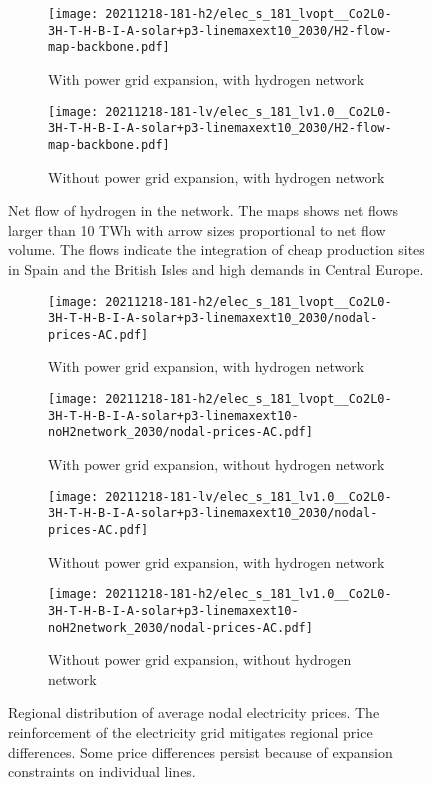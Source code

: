 \begin{figure}
    \begin{subfigure}{0.49\textwidth}
        \centering
        \caption{With power grid expansion, with hydrogen network}
        \texttt{[image: 20211218-181-h2/elec\_s\_181\_lvopt\_\_Co2L0-3H-T-H-B-I-A-solar+p3-linemaxext10\_2030/H2-flow-map-backbone.pdf]}
    \end{subfigure}
    \begin{subfigure}{0.49\textwidth}
        \centering
        \caption{Without power grid expansion, with hydrogen network}
        \texttt{[image: 20211218-181-lv/elec\_s\_181\_lv1.0\_\_Co2L0-3H-T-H-B-I-A-solar+p3-linemaxext10\_2030/H2-flow-map-backbone.pdf]}
    \end{subfigure}
    \caption{Net flow of hydrogen in the network. The maps shows net flows larger than 10 TWh with arrow sizes proportional to net flow volume. The flows indicate the integration of cheap production sites in Spain and the British Isles and high demands in Central Europe.}
    \label{fig:si:flow-h2}
\end{figure}

\begin{figure}
    \begin{subfigure}{0.49\textwidth}
        \centering
        \caption{With power grid expansion, with hydrogen network}
        \texttt{[image: 20211218-181-h2/elec\_s\_181\_lvopt\_\_Co2L0-3H-T-H-B-I-A-solar+p3-linemaxext10\_2030/nodal-prices-AC.pdf]}
    \end{subfigure}
    \begin{subfigure}{0.49\textwidth}
        \centering
        \caption{With power grid expansion, without hydrogen network}
        \texttt{[image: 20211218-181-h2/elec\_s\_181\_lvopt\_\_Co2L0-3H-T-H-B-I-A-solar+p3-linemaxext10-noH2network\_2030/nodal-prices-AC.pdf]}
    \end{subfigure}
    \begin{subfigure}{0.49\textwidth}
        \centering
        \caption{Without power grid expansion, with hydrogen network}
        \texttt{[image: 20211218-181-lv/elec\_s\_181\_lv1.0\_\_Co2L0-3H-T-H-B-I-A-solar+p3-linemaxext10\_2030/nodal-prices-AC.pdf]}
    \end{subfigure}
    \begin{subfigure}{0.49\textwidth}
        \centering
        \caption{Without power grid expansion, without hydrogen network}
        \texttt{[image: 20211218-181-h2/elec\_s\_181\_lv1.0\_\_Co2L0-3H-T-H-B-I-A-solar+p3-linemaxext10-noH2network\_2030/nodal-prices-AC.pdf]}
    \end{subfigure}
    \caption{Regional distribution of average nodal electricity prices. The reinforcement of the electricity grid mitigates regional price differences. Some price differences persist because of expansion constraints on individual lines.}
    \label{fig:si:lmp-ac}
\end{figure}

